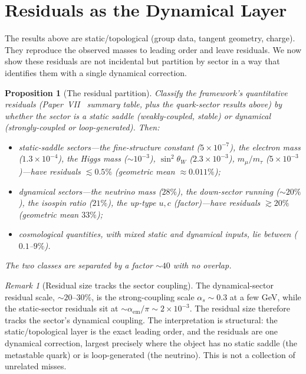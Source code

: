 \documentclass[11pt,a4paper]{article}
\newtheorem{proposition}[theorem]{Proposition}
\theoremstyle{definition}\newtheorem{definition}[theorem]{Definition}
\theoremstyle{remark}
\newtheorem{remark}[theorem]{Remark}
\newcommand{\alphas}{\alpha_s}
\newcommand{\alphaem}{\alpha_{\mathrm{em}}}
\begin{document}
\section{Residuals as the Dynamical Layer}
\label{P20:sec:residuals}

The results above are static/topological (group data, tangent geometry,
charge). They reproduce the observed masses to leading order and leave
residuals. We now show these residuals are not incidental but partition
by sector in a way that identifies them with a single dynamical
correction.

\begin{proposition}[The residual partition]
\label{P20:prop:residual_partition}
Classify the framework's quantitative residuals (Paper~VII~\cite{Paper7}
summary table, plus the quark-sector results above) by whether the
sector is a \emph{static saddle} (weakly-coupled, stable) or
\emph{dynamical} (strongly-coupled or loop-generated). Then:
\begin{itemize}[leftmargin=1.4em]
\item static-saddle sectors---the fine-structure constant
($5\times10^{-7}$), the electron mass ($1.3\times10^{-4}$), the Higgs
mass ($\sim10^{-3}$), $\sin^2\theta_W$ ($2.3\times10^{-3}$),
$m_\mu/m_\tau$ ($5\times10^{-3}$)---have residuals $\lesssim0.5\%$
(geometric mean $\approx0.011\%$);
\item dynamical sectors---the neutrino mass ($28\%$), the down-sector
running ($\sim20\%$), the isospin ratio ($21\%$), the up-type $u,c$
(factor)---have residuals $\gtrsim20\%$ (geometric mean $33\%$);
\item cosmological quantities, with mixed static and dynamical inputs,
lie between ($0.1$--$9\%$).
\end{itemize}
The two classes are separated by a factor $\sim40$ with no overlap.
\end{proposition}

\begin{remark}[Residual size tracks the sector coupling]
\label{P20:rem:coupling_scale}
The dynamical-sector residual scale, $\sim20$--$30\%$, is the
strong-coupling scale $\alphas\!\sim\!0.3$ at a few GeV, while the
static-sector residuals sit at $\sim\alphaem/\pi\sim2\times10^{-3}$.
The residual size therefore tracks the sector's dynamical coupling. The
interpretation is structural: the static/topological layer is the exact
leading order, and the residuals are one dynamical correction, largest
precisely where the object has no static saddle (the metastable quark)
or is loop-generated (the neutrino). This is not a collection of
unrelated misses.
\end{remark}
\end{document}
